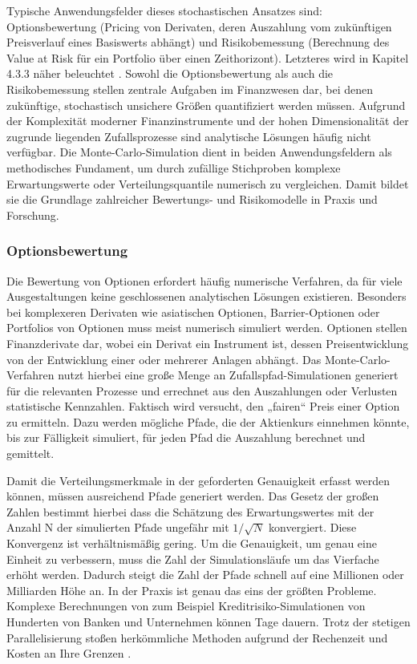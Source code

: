 Typische Anwendungsfelder dieses stochastischen Ansatzes sind: Optionsbewertung (Pricing von Derivaten, deren Auszahlung vom zukünftigen Preisverlauf eines Basiswerts abhängt) und Risikobemessung (Berechnung des Value at Risk für ein Portfolio über einen Zeithorizont). Letzteres wird in Kapitel 4.3.3 näher beleuchtet \cite{orus_quantum_2019}. Sowohl die Optionsbewertung als auch die Risikobemessung stellen zentrale Aufgaben im Finanzwesen dar, bei denen zukünftige, stochastisch unsichere Größen quantifiziert werden müssen. Aufgrund der Komplexität moderner Finanzinstrumente und der hohen Dimensionalität der zugrunde liegenden Zufallsprozesse sind analytische Lösungen häufig nicht verfügbar. Die Monte-Carlo-Simulation dient in beiden Anwendungsfeldern als methodisches Fundament, um durch zufällige Stichproben komplexe Erwartungswerte oder Verteilungsquantile numerisch zu vergleichen. Damit bildet sie die Grundlage zahlreicher Bewertungs- und Risikomodelle in Praxis und Forschung.

\subsubsection*{Optionsbewertung}
Die Bewertung von Optionen erfordert häufig numerische Verfahren, da für viele Ausgestaltungen keine geschlossenen analytischen Lösungen existieren. Besonders bei komplexeren Derivaten wie asiatischen Optionen, Barrier-Optionen oder Portfolios von Optionen muss meist numerisch simuliert werden. Optionen stellen Finanzderivate dar, wobei ein Derivat ein Instrument ist, dessen Preisentwicklung von der Entwicklung einer oder mehrerer Anlagen abhängt. Das Monte-Carlo-Verfahren nutzt hierbei eine große Menge an Zufallspfad-Simulationen generiert für die relevanten Prozesse und errechnet aus den Auszahlungen oder Verlusten statistische Kennzahlen. Faktisch wird versucht, den „fairen“ Preis einer Option zu ermitteln. Dazu werden mögliche Pfade, die der Aktienkurs einnehmen könnte, bis zur Fälligkeit simuliert, für jeden Pfad die Auszahlung berechnet und gemittelt\cite{orus_quantum_2019}.
 
Damit die Verteilungsmerkmale in der geforderten Genauigkeit erfasst werden können, müssen ausreichend Pfade generiert werden. Das Gesetz der großen Zahlen bestimmt hierbei dass die Schätzung des Erwartungswertes mit der Anzahl N der simulierten Pfade ungefähr mit $1/\sqrt{N}$ konvergiert. Diese Konvergenz ist verhältnismäßig gering. Um die Genauigkeit, um genau eine Einheit zu verbessern, muss die Zahl der Simulationsläufe um das Vierfache erhöht werden. Dadurch steigt die Zahl der Pfade schnell auf eine Millionen oder Milliarden Höhe an.
In der Praxis ist genau das eins der größten Probleme. Komplexe Berechnungen von zum Beispiel Kreditrisiko-Simulationen von Hunderten von Banken und Unternehmen können Tage dauern. Trotz der stetigen Parallelisierung stoßen herkömmliche Methoden aufgrund der Rechenzeit und Kosten an Ihre Grenzen \cite{orus_quantum_2019}.

